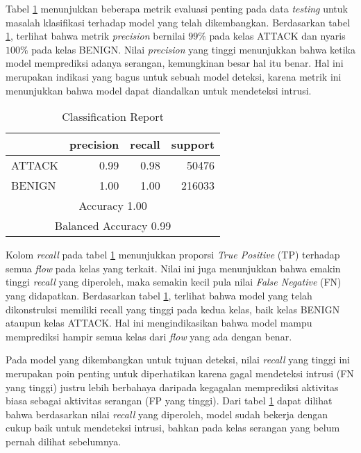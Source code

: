 \documentclass[a4paper,12pt]{report}
\begin{document}
Tabel \ref{classification_report} menunjukkan beberapa metrik evaluasi penting pada data \textit{testing} untuk masalah klasifikasi terhadap model yang telah dikembangkan. Berdasarkan tabel \ref{classification_report}, terlihat bahwa metrik \textit{precision} bernilai  $99\%$ pada kelas ATTACK dan nyaris $100\%$ pada kelas BENIGN.  Nilai \textit{precision} yang tinggi menunjukkan bahwa ketika model memprediksi adanya serangan, kemungkinan besar hal itu benar. Hal ini merupakan indikasi yang bagus untuk sebuah model deteksi, karena metrik ini menunjukkan bahwa model dapat diandalkan untuk mendeteksi intrusi. 
\begin{table}[h!]
	\centering
	\caption{Classification Report}
	\label{classification_report}
	\begin{tabular}{|l|r|r|r|}
		\hline
		& \textbf{precision} & \textbf{recall} & \textbf{support} \\
		\hline
		ATTACK & 0.99 & 0.98 & 50476 \\
		\hline
		BENIGN & 1.00 & 1.00 & 216033 \\
		\hline
		\multicolumn{4}{|c|}{Accuracy \hfill 1.00} \\
		\hline
		\multicolumn{4}{|c|}{Balanced Accuracy \hfill 0.99} \\
		\hline
	\end{tabular}
\end{table}

Kolom \textit{recall} pada tabel \ref{classification_report} menunjukkan proporsi \textit{True Positive} (TP) terhadap semua \textit{flow} pada kelas yang terkait. Nilai ini juga menunjukkan bahwa emakin tinggi \textit{recall} yang diperoleh, maka semakin kecil pula nilai \textit{False Negative} (FN) yang didapatkan.  Berdasarkan tabel \ref{classification_report}, terlihat bahwa model yang telah dikonstruksi memiliki recall yang tinggi pada kedua kelas, baik kelas BENIGN ataupun kelas ATTACK. Hal ini mengindikasikan bahwa model mampu memprediksi hampir semua kelas dari \textit{flow} yang ada dengan benar. 

Pada model yang dikembangkan untuk tujuan deteksi, nilai \textit{recall} yang tinggi ini merupakan poin penting untuk diperhatikan karena gagal mendeteksi intrusi (FN yang tinggi) justru lebih berbahaya daripada kegagalan memprediksi aktivitas biasa sebagai aktivitas serangan (FP yang tinggi). Dari tabel \ref{classification_report} dapat dilihat bahwa berdasarkan nilai \textit{recall} yang diperoleh, model sudah bekerja dengan cukup baik untuk mendeteksi intrusi, bahkan pada kelas serangan yang belum pernah dilihat sebelumnya.
\end{document}
